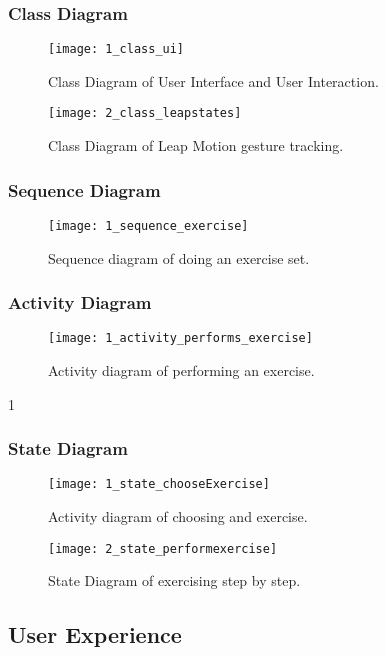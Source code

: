 \clearpage

\subsubsection{Class Diagram}
\begin{figure}[!h]
\centering
\texttt{[image: 1\_class\_ui]}
\caption{Class Diagram of User Interface and User Interaction.}\label{class_ui}
\end{figure}

\clearpage

\begin{figure}[!h]
\centering
\texttt{[image: 2\_class\_leapstates]}
\caption{Class Diagram of Leap Motion gesture tracking.}\label{class_leap}
\end{figure}

\clearpage

\subsubsection{Sequence Diagram}
\begin{figure}[!h]
\centering
\texttt{[image: 1\_sequence\_exercise]}
\caption{Sequence diagram of doing an exercise set.}\label{sequence_exercise}
\end{figure}

\clearpage

\subsubsection{Activity Diagram}
\begin{figure}[!h]
\centering
\texttt{[image: 1\_activity\_performs\_exercise]}
\caption{Activity diagram of performing an exercise.}\label{activity_performs}
\end{figure}1

\clearpage

\subsubsection{State Diagram}

\begin{figure}[!h]
\centering
\texttt{[image: 1\_state\_chooseExercise]}
\caption{Activity diagram of choosing and exercise.}\label{state_choose}
\end{figure}

\clearpage

\begin{figure}[!h]
\centering
\texttt{[image: 2\_state\_performexercise]}
\caption{State Diagram of exercising step by step.}\label{state_perform}
\end{figure}

\clearpage

\subsection{User Experience}


\clearpage